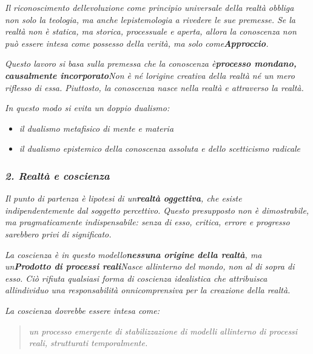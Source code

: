 \documentclass[
]{article}
\begin{document}
\emph{Il riconoscimento dell\textquotesingle evoluzione come principio universale della realtà obbliga non solo la teologia, ma anche l\textquotesingle epistemologia a rivedere le sue premesse. Se la realtà non è statica, ma storica, processuale e aperta, allora la conoscenza non può essere intesa come possesso della verità, ma solo come\textbf{Approccio}.}

\emph{Questo lavoro si basa sulla premessa che la conoscenza è\textbf{processo mondano, causalmente incorporato}Non è né l\textquotesingle origine creativa della realtà né un mero riflesso di essa. Piuttosto, la conoscenza nasce nella realtà e attraverso la realtà.}

\emph{In questo modo si evita un doppio dualismo:}

\begin{itemize}
\item
  \emph{il dualismo metafisico di mente e materia}
\item
  \emph{il dualismo epistemico della conoscenza assoluta e dello scetticismo radicale}
\end{itemize}

\subsubsection{\texorpdfstring{\emph{\textbf{2. Realtà e coscienza}}}{2. Realtà e coscienza}}\label{realtuxe0-e-coscienza}

\emph{Il punto di partenza è l\textquotesingle ipotesi di un\textbf{realtà oggettiva}, che esiste indipendentemente dal soggetto percettivo. Questo presupposto non è dimostrabile, ma pragmaticamente indispensabile: senza di esso, critica, errore e progresso sarebbero privi di significato.}

\emph{La coscienza è in questo modello\textbf{nessuna origine della realtà}, ma un\textbf{Prodotto di processi reali}Nasce all\textquotesingle interno del mondo, non al di sopra di esso. Ciò rifiuta qualsiasi forma di coscienza idealistica che attribuisca all\textquotesingle individuo una responsabilità onnicomprensiva per la creazione della realtà.}

\emph{La coscienza dovrebbe essere intesa come:}

\begin{quote}
\emph{un processo emergente di stabilizzazione di modelli all\textquotesingle interno di processi reali, strutturati temporalmente.}
\end{quote}
\end{document}
